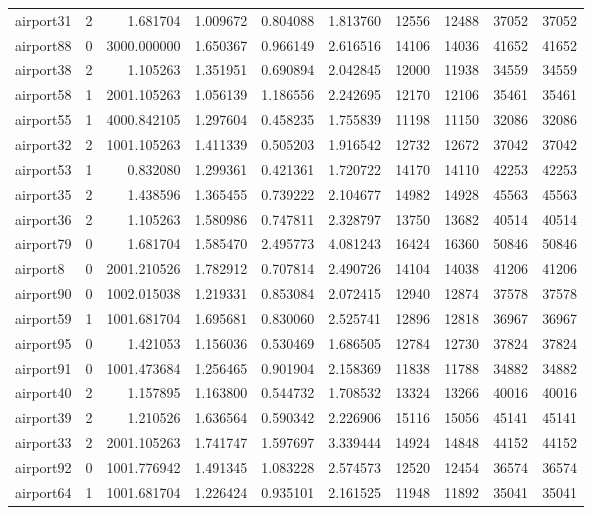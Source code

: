 \begin{longtable}{|l|r|r|r|r|r|r|r|r|r|}
airport31 & 2 & 1.681704 & 1.009672 & 0.804088 & 1.813760 & 12556 & 12488 & 37052 & 37052 \\
airport88 & 0 & 3000.000000 & 1.650367 & 0.966149 & 2.616516 & 14106 & 14036 & 41652 & 41652 \\
airport38 & 2 & 1.105263 & 1.351951 & 0.690894 & 2.042845 & 12000 & 11938 & 34559 & 34559 \\
airport58 & 1 & 2001.105263 & 1.056139 & 1.186556 & 2.242695 & 12170 & 12106 & 35461 & 35461 \\
airport55 & 1 & 4000.842105 & 1.297604 & 0.458235 & 1.755839 & 11198 & 11150 & 32086 & 32086 \\
airport32 & 2 & 1001.105263 & 1.411339 & 0.505203 & 1.916542 & 12732 & 12672 & 37042 & 37042 \\
airport53 & 1 & 0.832080 & 1.299361 & 0.421361 & 1.720722 & 14170 & 14110 & 42253 & 42253 \\
airport35 & 2 & 1.438596 & 1.365455 & 0.739222 & 2.104677 & 14982 & 14928 & 45563 & 45563 \\
airport36 & 2 & 1.105263 & 1.580986 & 0.747811 & 2.328797 & 13750 & 13682 & 40514 & 40514 \\
airport79 & 0 & 1.681704 & 1.585470 & 2.495773 & 4.081243 & 16424 & 16360 & 50846 & 50846 \\
airport8 & 0 & 2001.210526 & 1.782912 & 0.707814 & 2.490726 & 14104 & 14038 & 41206 & 41206 \\
airport90 & 0 & 1002.015038 & 1.219331 & 0.853084 & 2.072415 & 12940 & 12874 & 37578 & 37578 \\
airport59 & 1 & 1001.681704 & 1.695681 & 0.830060 & 2.525741 & 12896 & 12818 & 36967 & 36967 \\
airport95 & 0 & 1.421053 & 1.156036 & 0.530469 & 1.686505 & 12784 & 12730 & 37824 & 37824 \\
airport91 & 0 & 1001.473684 & 1.256465 & 0.901904 & 2.158369 & 11838 & 11788 & 34882 & 34882 \\
airport40 & 2 & 1.157895 & 1.163800 & 0.544732 & 1.708532 & 13324 & 13266 & 40016 & 40016 \\
airport39 & 2 & 1.210526 & 1.636564 & 0.590342 & 2.226906 & 15116 & 15056 & 45141 & 45141 \\
airport33 & 2 & 2001.105263 & 1.741747 & 1.597697 & 3.339444 & 14924 & 14848 & 44152 & 44152 \\
airport92 & 0 & 1001.776942 & 1.491345 & 1.083228 & 2.574573 & 12520 & 12454 & 36574 & 36574 \\
airport64 & 1 & 1001.681704 & 1.226424 & 0.935101 & 2.161525 & 11948 & 11892 & 35041 & 35041 \\

\end{longtable}
